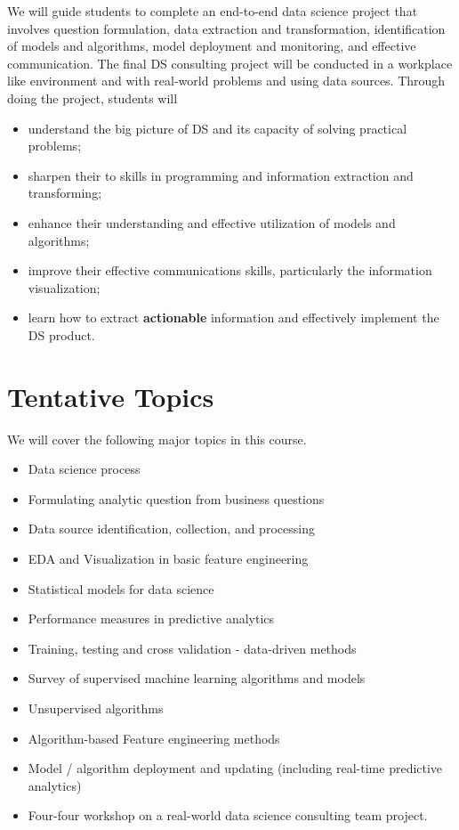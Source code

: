 \documentclass[
]{book}
\providecommand{\tightlist}{%
  \setlength{\itemsep}{0pt}\setlength{\parskip}{0pt}}
\begin{document}
We will guide students to complete an end-to-end data science project that involves question formulation, data extraction and transformation, identification of models and algorithms, model deployment and monitoring, and effective communication. The final DS consulting project will be conducted in a workplace like environment and with real-world problems and using data sources. Through doing the project, students will

\begin{itemize}
\tightlist
\item
  understand the big picture of DS and its capacity of solving practical problems;\\
\item
  sharpen their to skills in programming and information extraction and transforming;
\item
  enhance their understanding and effective utilization of models and algorithms;
\item
  improve their effective communications skills, particularly the information visualization;
\item
  learn how to extract \textbf{actionable} information and effectively implement the DS product.
\end{itemize}

\hypertarget{tentative-topics}{%
\section{Tentative Topics}\label{tentative-topics}}

We will cover the following major topics in this course.

\begin{itemize}
\tightlist
\item
  Data science process
\item
  Formulating analytic question from business questions
\item
  Data source identification, collection, and processing
\item
  EDA and Visualization in basic feature engineering
\item
  Statistical models for data science
\item
  Performance measures in predictive analytics
\item
  Training, testing and cross validation - data-driven methods
\item
  Survey of supervised machine learning algorithms and models
\item
  Unsupervised algorithms
\item
  Algorithm-based Feature engineering methods
\item
  Model / algorithm deployment and updating (including real-time predictive analytics)
\item
  Four-four workshop on a real-world data science consulting team project.
\end{itemize}
\end{document}
